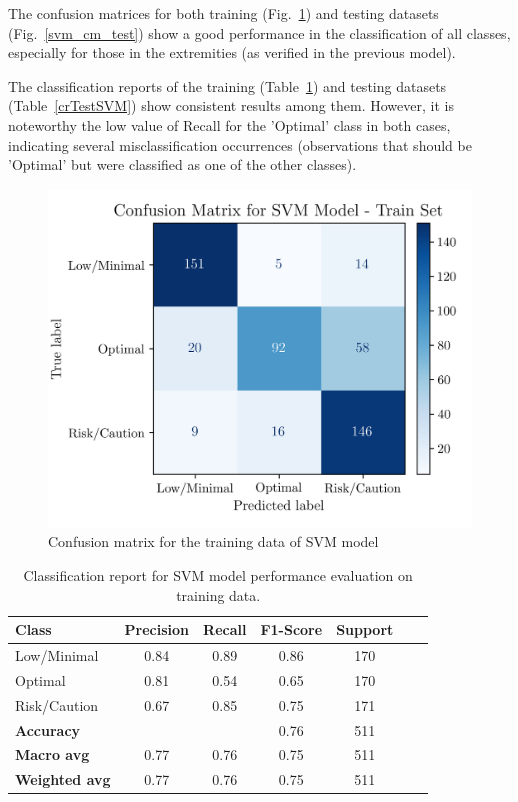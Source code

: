 \documentclass[conference]{IEEEtran}
\begin{document}
The confusion matrices for both training (Fig.~\ref{svm_cm_train}) and testing datasets (Fig.~\ref{svm_cm_test}) show a good performance in the classification of all classes, especially for those in the extremities (as verified in the previous model).

The classification reports of the training (Table~\ref{crTrainSVM}) and testing datasets (Table~\ref{crTestSVM}) show consistent results among them. However, it is noteworthy the low value of Recall for the 'Optimal' class in both cases, indicating several misclassification occurrences (observations that should be 'Optimal' but were classified as one of the other classes). 

\begin{figure}[H]
    \centering
    \includegraphics[width=1\linewidth]{assets/SVM_ConfusionMatrixTrain.png}
    \caption{Confusion matrix for the training data of SVM model}
    \label{svm_cm_train}
\end{figure} %

\begin{table}[H]
\centering
\caption{Classification report for SVM model performance evaluation on training data.}
\label{crTrainSVM}
\begin{tabular}{lcccccc}
\toprule
\textbf{Class} & \textbf{Precision} & \textbf{Recall} & \textbf{F1-Score} & \textbf{Support} \\
\midrule
Low/Minimal & 0.84 & 0.89 & 0.86 & 170 \\
Optimal & 0.81 & 0.54 & 0.65 & 170 \\
Risk/Caution & 0.67 & 0.85 & 0.75 & 171 \\
\midrule
\textbf{Accuracy} &  &  & 0.76 & 511 \\
\textbf{Macro avg} & 0.77 & 0.76 & 0.75 & 511 \\
\textbf{Weighted avg} & 0.77 & 0.76 & 0.75 & 511 \\
\bottomrule
\end{tabular}
\end{table} %
\end{document}
